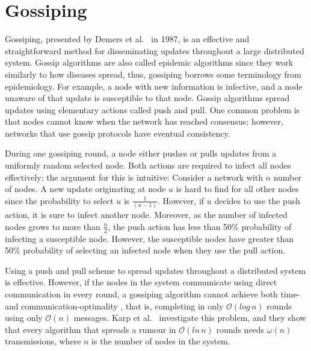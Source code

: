 \section{Gossiping}
\begin{newtext}
Gossiping, presented by Demers et al.~\cite{Demers1987-gossiping-first-paper} in 1987, is an effective and straightforward method for disseminating updates throughout a large distributed system. Gossip algorithms are also called epidemic algorithms since they work similarly to how diseases spread, thus, gossiping borrows some terminology from epidemiology. For example, a node with new information is infective, and a node unaware of that update is susceptible to that node. Gossip algorithms spread updates using elementary actions called push and pull. One common problem is that nodes cannot know when the network has reached consensus; however, networks that use gossip protocols have eventual consistency.

During one gossiping round, a node either pushes or pulls updates from a uniformly random selected node. Both actions are required to infect all nodes effectively; the argument for this is intuitive: Consider a network with $n$ number of nodes. A new update originating at node $u$ is hard to find for all other nodes since the probability to select $u$ is $\frac{1}{(n-1)}$. However, if $u$ decides to use the push action, it is sure to infect another node. Moreover, as the number of infected nodes grows to more than $\frac{n}{2}$, the push action has less than 50\% probability of infecting a susceptible node. However, the susceptible nodes have greater than 50\% probability of selecting an infected node when they use the pull action.

Using a push and pull scheme to spread updates throughout a distributed system is effective. However, if the nodes in the system communicate using direct communication in every round, a gossiping algorithm cannot achieve both time- and communication-optimality \cite{Karp2000-randomized-rumour-spreading}, that is, completing in only $\mathcal{O}(log\,n)$ rounds using only $\mathcal{O}(n)$ messages. Karp et al.~\cite{Karp2000-randomized-rumour-spreading} investigate this problem, and they show that every algorithm that spreads a rumour in $\mathcal{O}(ln\,n)$ rounds needs $\mathcal{\omega}(n)$ transmissions, where $n$ is the number of nodes in the system.


\end{newtext}
